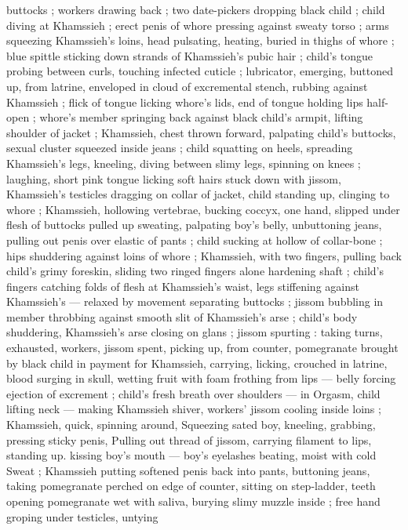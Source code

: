 buttocks ; workers drawing back ; two date-pickers dropping black
child ; child diving at Khamssieh ; erect penis of whore pressing
against sweaty torso ; arms squeezing Khamssieh’s loins, head
pulsating, heating, buried in thighs of whore ; blue spittle sticking
down strands of Khamssieh’s pubic hair ; child's tongue probing
between curls, touching infected cuticle ; lubricator, emerging,
buttoned up, from latrine, enveloped in cloud of excremental stench,
rubbing against Khamssieh ; flick of tongue licking whore's lids, end
of tongue holding lips half-open ; whore’s member springing back
against black child's armpit, lifting shoulder of jacket ; Khamssieh,
chest thrown forward, palpating child's buttocks, sexual cluster
squeezed inside jeans ; child squatting on heels, spreading
Khamssieh's legs, kneeling, diving between slimy legs, spinning on
knees ; laughing, short pink tongue licking soft hairs stuck down with
jissom, Khamssieh’s testicles dragging on collar of jacket, child
standing up, clinging to whore ; Khamssieh, hollowing vertebrae,
bucking coccyx, one hand, slipped under flesh of buttocks pulled up
sweating, palpating boy's belly, unbuttoning jeans, pulling out penis
over elastic of pants ; child sucking at hollow of collar-bone ; hips
shuddering against loins of whore ; Khamssieh, with two fingers,
pulling back child's grimy foreskin, sliding two ringed fingers alone
hardening shaft ; child's fingers catching folds of flesh at
Khamssieh's waist, legs stiffening against Khamssieh's --- relaxed by
movement separating buttocks ; jissom bubbling in member
throbbing against smooth slit of Khamssieh's arse ; child's body
shuddering, Khamssieh's arse closing on glans ; jissom spurting :
taking turns, exhausted, workers, jissom spent, picking up, from
counter, pomegranate brought by black child in payment for
Khamssieh, carrying, licking, crouched in latrine, blood surging in
skull, wetting fruit with foam frothing from lips --- belly forcing
ejection of excrement ; child's fresh breath over shoulders --- in
Orgasm, child lifting neck --- making Khamssieh shiver, workers’
jissom cooling inside loins ; Khamssieh, quick, spinning around,
Squeezing sated boy, kneeling, grabbing, pressing sticky penis,
Pulling out thread of jissom, carrying filament to lips, standing up.
kissing boy's mouth --- boy’s eyelashes beating, moist with cold
Sweat ; Khamssieh putting softened penis back into pants, buttoning
jeans, taking pomegranate perched on edge of counter, sitting on
step-ladder, teeth opening pomegranate wet with saliva, burying
slimy muzzle inside ; free hand groping under testicles, untying
